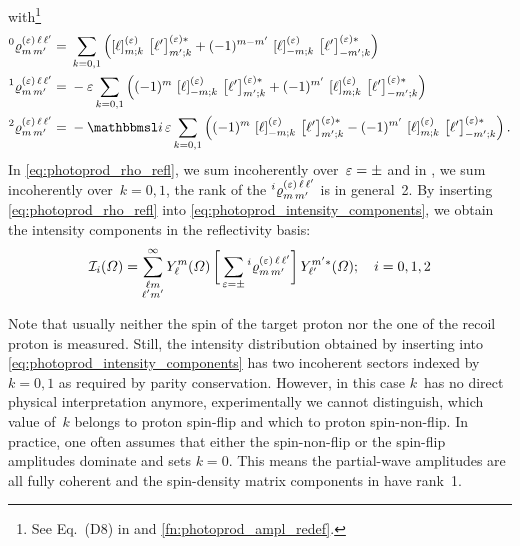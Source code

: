 with\footnote{See Eq.~(D8) in  and
\cref{fn:photoprod_ampl_redef}.}
\begin{align}
  \label{eq:photoprod_rho_0_refl}
  \prescript{0}{}{\varrho}^{(\refl)\, \ell\, \ell'}_{m\, m'}
  ={}& \sum_{k = 0, 1} \rBrk[2]{\sBrk{\ell}^{(\refl)}_{m; k}\, \sBrk{\ell'}^{(\refl) *}_{m'; k}
  + (-1)^{m - m'}\, \sBrk{\ell}^{(\refl)}_{{-m}; k}\, \sBrk{\ell'}^{(\refl) *}_{{-m'}; k}}
  \\
  \label{eq:photoprod_rho_1_refl}
  \prescript{1}{}{\varrho}^{(\refl)\, \ell\, \ell'}_{m\, m'}
  ={}& -\refl \sum_{k = 0, 1}
  \rBrk[2]{(-1)^m\, \sBrk{\ell}^{(\refl)}_{{-m}; k}\, \sBrk{\ell'}^{(\refl) *}_{m'; k}
  + (-1)^{m'}\, \sBrk{\ell}^{(\refl)}_{m; k}\, \sBrk{\ell'}^{(\refl) *}_{{-m'}; k}}
  \\
  \label{eq:photoprod_rho_2_refl}
  \prescript{2}{}{\varrho}^{(\refl)\, \ell\, \ell'}_{m\, m'}
  ={}& -\imag\, \refl \sum_{k = 0, 1}
  \rBrk[2]{(-1)^m\, \sBrk{\ell}^{(\refl)}_{{-m}; k}\, \sBrk{\ell'}^{(\refl) *}_{m'; k}
  - (-1)^{m'}\, \sBrk{\ell}^{(\refl)}_{m; k}\, \sBrk{\ell'}^{(\refl) *}_{{-m'}; k}}.
\end{align}
In \cref{eq:photoprod_rho_refl}, we sum incoherently over~$\varepsilon =
\pm$ and in
, we sum
incoherently over~$k = 0, 1$, \ie the rank of the
$\prescript{i}{}{\varrho}^{(\varepsilon)\, \ell\, \ell'}_{m\, m'}$ is in
general~2.  By inserting \cref{eq:photoprod_rho_refl} into
\cref{eq:photoprod_intensity_components}, we obtain the intensity
components in the reflectivity basis:
\begin{equation}
  \label{eq:photoprod_intensity_components_refl}
  \mathcal{I}_i(\Omega)
  = \sum_{\substack{\ell m \\ \ell' m'}}^\infty
  Y_\ell^m(\Omega)
  \sBrk[3]{\, \sum_{\refl = \pm} \prescript{i}{}{\varrho}^{(\refl)\, \ell\, \ell'}_{m\, m'}}
  Y_{\ell'}^{m' *}(\Omega);
  \quad i = 0, 1, 2
\end{equation}

Note that usually neither the spin of the target proton
nor the one of the recoil proton is measured.  Still, the intensity
distribution obtained by inserting
 into
\cref{eq:photoprod_intensity_components} has two incoherent sectors
indexed by~$k = 0, 1$ as required by parity conservation.  However, in
this case $k$~has no direct physical interpretation anymore, \ie
experimentally we cannot distinguish, which value of~$k$ belongs to
proton spin-flip and which to proton spin-non-flip.  In practice, one
often assumes that either the spin-non-flip or the spin-flip
amplitudes dominate and sets $k = 0$.  This means the partial-wave
amplitudes are all fully coherent and the spin-density matrix
components in
 have
rank~1.

